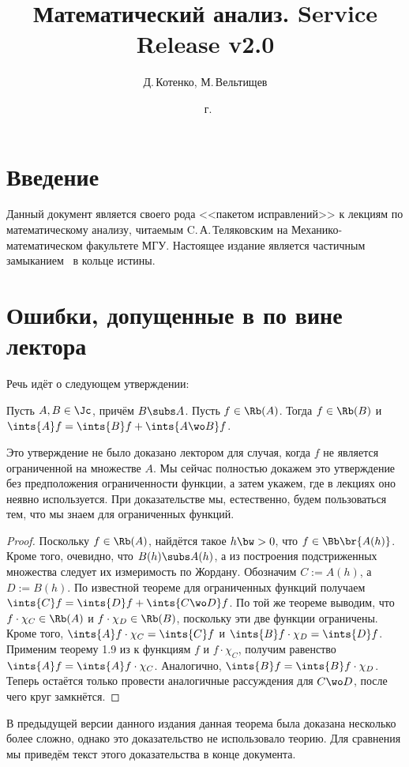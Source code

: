 \documentclass[a4paper]{article}
\title{Математический анализ. Service Release v2.0}
\author{Д.\,Котенко, М.\,Вельтищев}
\date{\сегодня~г.}
\begin{document}
\maketitle

\section{Введение}
Данный документ является своего рода <<пакетом исправлений>> к лекциям по математическому анализу,
читаемым C.\,А.\,Теляковским на Механико-математическом факультете МГУ. Настоящее издание является
частичным замыканием~\cite{lectures} в кольце истины.

\section{Ошибки, допущенные в \cite{lectures} по вине лектора}
Речь идёт о следующем утверждении:

\begin{theorem}
Пусть $A, B \in \Jc$, причём $B \subs A$. Пусть $f \in \Rb(A)$. Тогда $f \in \Rb(B)$ и
$\ints{A} f = \ints{B} f + \ints{A \wo B} f$.
\end{theorem}
Это утверждение не было доказано лектором для случая, когда $f$ не является ограниченной на
множестве $A$. Мы сейчас полностью докажем это утверждение без предположения ограниченности
функции, а затем укажем, где в лекциях оно неявно используется. При доказательстве мы, естественно,
будем пользоваться тем, что мы знаем для ограниченных функций.

\begin{proof}
Поскольку $f \in \Rb(A)$, найдётся такое $h\bw>0$, что $f \in \Bb\br{A(h)}$. Кроме того, очевидно,
что $B(h) \subs A(h)$, а из построения подстриженных множества следует их измеримость по Жордану.
Обозначим $C := A(h)$, а $D := B(h)$. По известной теореме для ограниченных функций получаем
$\ints{C} f = \ints{D} f + \ints{C\wo D}f$. По той же теореме выводим, что
$f \cdot \chi_C \in \Rb(A)$ и $f \cdot \chi_D \in \Rb(B)$, поскольку эти две функции
ограничены. Кроме того, $\ints{A} f \cdot \chi_C = \ints{C} f$ и $\ints{B} f \cdot \chi_D = \ints{D} f$.
Применим теорему 1.9 из \cite{lectures} к функциям $f$ и $f \cdot \chi_C$, получим
равенство $\ints{A} f = \ints{A} f \cdot \chi_C$. Аналогично, $\ints{B} f = \ints{B} f \cdot \chi_D$.
Теперь остаётся только провести аналогичные рассуждения для $C\wo D$, после чего круг замкнётся.
\end{proof}

\begin{note}
В предыдущей версии данного издания \cite{patch} данная теорема была доказана несколько более сложно,
однако это доказательство не использовало теорию. Для сравнения мы приведём текст этого доказательства
в конце документа.
\end{note}
\end{document}
